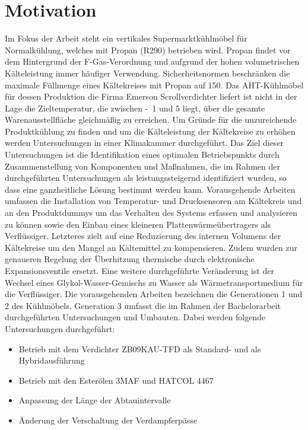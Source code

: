 
\chapter{Motivation}
\label{cha:Motivation}

Im Fokus der Arbeit steht ein vertikales Supermarktkühlmöbel für Normalkühlung, welches mit Propan (R290) betrieben wird\cite{DINDeutschesInstitutfurNormunge.V..b}. Propan findet vor dem Hintergrund der F-Gas-Verordnung und aufgrund der hohen volumetrischen Kälteleistung immer häufiger Verwendung\cite{EUParlamentRat.2006}\cite{Huber.2016}. Sicherheitsnormen beschränken die maximale Füllmenge eines Kältekreises mit Propan auf \unit{150}{\gram}\cite{DINDeutschesInstitutfurNormunge.V..2014b}. Das AHT-Kühlmöbel für dessen Produktion die Firma Emerson Scrollverdichter liefert ist nicht in der Lage die Zieltemperatur, die zwischen \unit{-1}{\celsius} und \unit{5}{\celsius} liegt, über die gesamte Warenausstellfläche gleichmäßig zu erreichen. Um Gründe für die unzureichende Produktkühlung zu finden und um die Kälteleistung der Kältekreise zu erhöhen werden Untersuchungen in einer Klimakammer durchgeführt. Das Ziel dieser Untersuchungen ist die Identifikation eines optimalen Betriebspunkts durch Zusammenstellung von Komponenten und Maßnahmen, die im Rahmen der durchgeführten Untersuchungen als leistungssteigernd identifiziert wurden, so dass eine ganzheitliche Lösung bestimmt werden kann. 
Vorausgehende Arbeiten umfassen die Installation von Temperatur- und Drucksensoren am Kältekreis und an den Produktdummys um das Verhalten des Systems erfassen und analysieren zu können sowie den Einbau eines kleineren Plattenwärmeübertragers als Verflüssiger. Letzteres zielt auf eine Reduzierung des internen Volumens der Kältekreise um den Mangel an Kältemittel zu kompensieren. Zudem wurden zur genaueren Regelung der Überhitzung thermische durch elektronische Expansionsventile ersetzt. Eine weitere durchgeführte Veränderung ist der Wechsel eines Glykol-Wasser-Gemischs zu Wasser als Wärmetransportmedium für die Verflüssiger.
Die vorausgehenden Arbeiten bezeichnen die Generationen 1 und 2 des Kühlmöbels.
Generation 3 umfasst die im Rahmen der Bachelorarbeit durchgeführten Untersuchungen und Umbauten.
Dabei werden folgende Untersuchungen durchgeführt:

\begin{itemize} 
\item Betrieb mit dem Verdichter ZB09KAU-TFD als Standard- und als Hybridausführung
\item Betrieb mit den Esterölen 3MAF und HATCOL 4467
\item Anpassung der Länge der Abtauintervalle
\item Änderung der Verschaltung der Verdampferpässe
\end{itemize}

